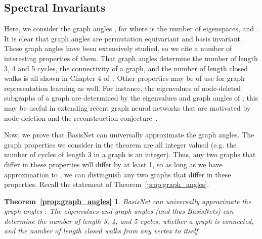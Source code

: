 \documentclass{article} \usepackage{iclr2023_conference,times}
\begin{document}
\subsection{Spectral Invariants}\label{appendix:spectral_invariants}

Here, we consider the graph angles , for  where  is the number of eigenspaces, and . It is clear that graph angles are permutation equivariant and basis invariant. These graph angles have been extensively studied, so we cite a number of interesting properties of them. That graph angles determine the number of length 3, 4 and 5 cycles, the connectivity of a graph, and the number of length  closed walks is all shown in Chapter 4 of~\cite{cvetkovic1997eigenspaces}. Other properties may be of use for graph representation learning as well. For instance, the eigenvalues of node-deleted subgraphs of a graph  are determined by the eigenvalues and graph angles of ; this may be useful in extending recent graph neural networks that are motivated by node deletion and the reconstruction conjecture~\citep{cotta2021reconstruction,bevilacqua2021equivariant,papp2021dropgnn,tahmasebi2020counting}.

Now, we prove that BasisNet can universally approximate the graph angles. The graph properties we consider in the theorem are all integer valued (e.g. the number of cycles of length 3 in a graph is an integer). Thus, any two graphs that differ in these properties will differ by at least 1, so as long as we have approximation to , we can distinguish any two graphs that differ in these properties. Recall the statement of Theorem~\ref{prop:graph_angles}.

\newtheorem*{prop:graph_angles}{Theorem~\ref{prop:graph_angles}}
\begin{prop:graph_angles}
    BasisNet can universally approximate the graph angles . The eigenvalues and graph angles (and thus BasisNets) can determine the number of length 3, 4, and 5 cycles, whether a graph is connected, and the number of length  closed walks from any vertex to itself.
\end{prop:graph_angles}
\end{document}
